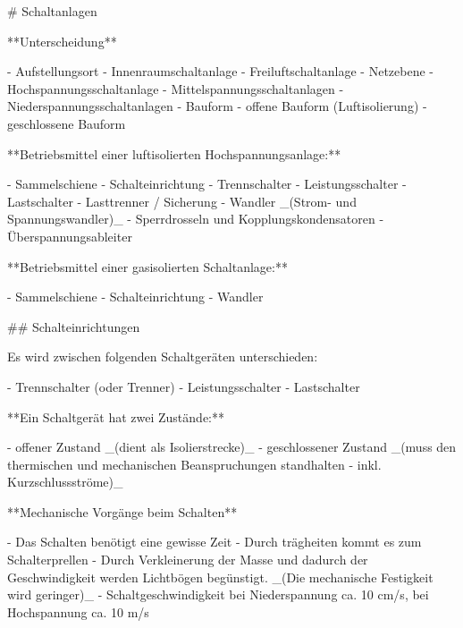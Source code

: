 \begin{markdown}
# Schaltanlagen


**Unterscheidung**

- Aufstellungsort
    - Innenraumschaltanlage
    - Freiluftschaltanlage
- Netzebene
    - Hochspannungsschaltanlage
    - Mittelspannungsschaltanlagen
    - Niederspannungsschaltanlagen
- Bauform
    - offene Bauform (Luftisolierung)
    - geschlossene Bauform

**Betriebsmittel einer luftisolierten Hochspannungsanlage:**

- Sammelschiene
- Schalteinrichtung
    - Trennschalter
    - Leistungsschalter
    - Lastschalter
    - Lasttrenner / Sicherung
- Wandler _(Strom- und Spannungswandler)_
- Sperrdrosseln und Kopplungskondensatoren 
- Überspannungsableiter

**Betriebsmittel einer gasisolierten Schaltanlage:**

- Sammelschiene
- Schalteinrichtung
- Wandler

## Schalteinrichtungen


Es wird zwischen folgenden Schaltgeräten unterschieden:

- Trennschalter (oder Trenner)
- Leistungsschalter
- Lastschalter

**Ein Schaltgerät hat zwei Zustände:**

- offener Zustand _(dient als Isolierstrecke)_
- geschlossener Zustand _(muss den thermischen und mechanischen Beanspruchungen standhalten - inkl. Kurzschlussströme)_

**Mechanische Vorgänge beim Schalten**

- Das Schalten benötigt eine gewisse Zeit
- Durch trägheiten kommt es zum Schalterprellen
- Durch Verkleinerung der Masse und dadurch der Geschwindigkeit werden Lichtbögen begünstigt. _(Die mechanische Festigkeit wird geringer)_ 
- Schaltgeschwindigkeit bei Niederspannung ca. 10 cm/s, bei Hochspannung ca. 10 m/s


\end{markdown}
